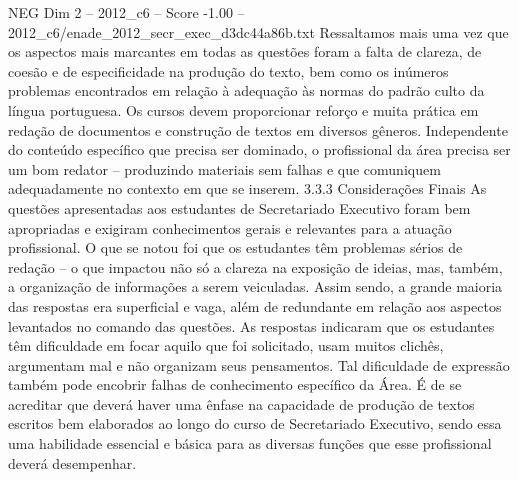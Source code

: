 \begin{textsample}{NEG Dim 2 – 2012\_c6 – Score -1.00 – 2012\_c6/enade\_2012\_secr\_exec\_d3dc44a86b.txt}
Ressaltamos mais uma vez que os aspectos mais marcantes em todas as questões foram a falta de clareza, de coesão e de especificidade na produção do texto, bem como os inúmeros problemas encontrados em relação à adequação às normas do padrão culto da língua portuguesa.
Os cursos devem proporcionar reforço e muita prática em redação de documentos e construção de textos em diversos gêneros.
Independente do conteúdo específico que precisa ser dominado, o profissional da área precisa ser um bom redator – produzindo materiais sem falhas e que comuniquem adequadamente no contexto em que se inserem. 3.3.3 Considerações Finais As questões apresentadas aos estudantes de Secretariado Executivo foram bem apropriadas e exigiram conhecimentos gerais e relevantes para a atuação profissional.
O que se notou foi que os estudantes têm problemas sérios de redação – o que impactou não só a clareza na exposição de ideias, mas, também, a organização de informações a serem veiculadas.
Assim sendo, a grande maioria das respostas era superficial e vaga, além de redundante em relação aos aspectos levantados no comando das questões.
As respostas indicaram que os estudantes têm dificuldade em focar aquilo que foi solicitado, usam muitos clichês, argumentam mal e não organizam seus pensamentos.
Tal dificuldade de expressão também pode encobrir falhas de conhecimento específico da Área.
É de se acreditar que deverá haver uma ênfase na capacidade de produção de textos escritos bem elaborados ao longo do curso de Secretariado Executivo, sendo essa uma habilidade essencial e básica para as diversas funções que esse profissional deverá desempenhar.

\end{textsample}
